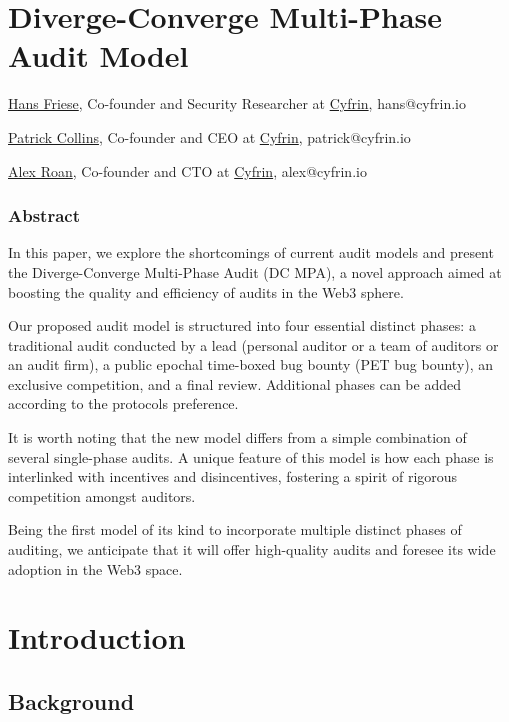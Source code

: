 \documentclass[10pt]{extarticle}
\begin{document}
\section*{Diverge-Converge Multi-Phase Audit Model}\label{diverge-converge-multi-phase-audit-model}

\par
\href{hans@cyfrin.io}{Hans Friese}, Co-founder and Security Researcher at \href{https://www.cyfrin.io/}{Cyfrin}, hans@cyfrin.io
\par
\href{patrick@cyfrin.io}{Patrick Collins}, Co-founder and CEO at \href{https://www.cyfrin.io/}{Cyfrin}, patrick@cyfrin.io
\par
\href{alex@cyfrin.io}{Alex Roan}, Co-founder and CTO at \href{https://www.cyfrin.io/}{Cyfrin}, alex@cyfrin.io

\subsubsection*{Abstract}\label{abstract}

In this paper, we explore the shortcomings of current audit models and
present the Diverge-Converge Multi-Phase Audit (DC MPA), a novel
approach aimed at boosting the quality and efficiency of audits in the
Web3 sphere.

Our proposed audit model is structured into four essential distinct
phases: a traditional audit conducted by a lead (personal auditor or a
team of auditors or an audit firm), a public epochal time-boxed bug
bounty (PET bug bounty), an exclusive competition, and a final review.
Additional phases can be added according to the
protocol\textquotesingle s preference.

It is worth noting that the new model differs from a simple combination
of several single-phase audits. A unique feature of this model is how
each phase is interlinked with incentives and disincentives, fostering a
spirit of rigorous competition amongst auditors.

Being the first model of its kind to incorporate multiple distinct
phases of auditing, we anticipate that it will offer high-quality audits
and foresee its wide adoption in the Web3 space.

\section{Introduction}\label{1-introduction}

\subsection{Background}\label{11-background}
\end{document}
